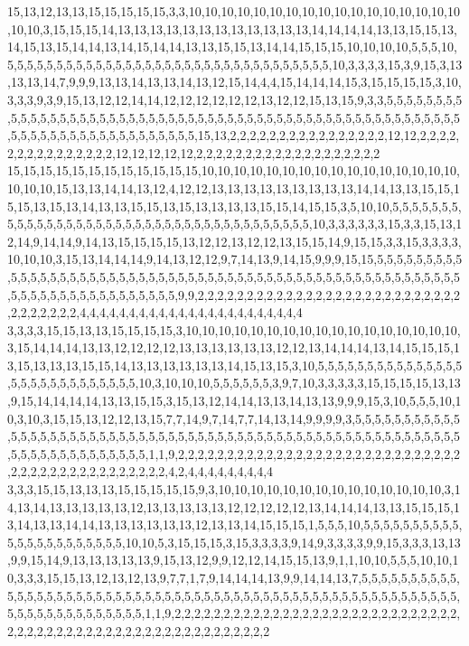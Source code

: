 15,13,12,13,13,15,15,15,15,15,3,3,10,10,10,10,10,10,10,10,10,10,10,10,10,10,10,10,10,10,10,3,15,15,15,14,13,13,13,13,13,13,13,13,13,13,13,13,14,14,14,14,13,13,15,15,13,14,15,13,15,14,14,13,14,15,14,14,13,13,15,15,13,14,14,15,15,15,10,10,10,10,5,5,5,10,5,5,5,5,5,5,5,5,5,5,5,5,5,5,5,5,5,5,5,5,5,5,5,5,5,5,5,5,5,5,5,5,5,10,3,3,3,3,15,3,9,15,3,13,13,13,14,7,9,9,9,13,13,14,13,13,14,13,12,15,14,4,4,15,14,14,14,15,3,15,15,15,15,3,10,3,3,3,9,3,9,15,13,12,12,14,14,12,12,12,12,12,12,13,12,12,15,13,15,9,3,3,5,5,5,5,5,5,5,5,5,5,5,5,5,5,5,5,5,5,5,5,5,5,5,5,5,5,5,5,5,5,5,5,5,5,5,5,5,5,5,5,5,5,5,5,5,5,5,5,5,5,5,5,5,5,5,5,5,5,5,5,5,5,5,5,5,5,5,5,5,5,5,5,5,15,13,2,2,2,2,2,2,2,2,2,2,2,2,2,2,2,2,12,12,2,2,2,2,2,2,2,2,2,2,2,2,2,2,2,12,12,12,12,12,2,2,2,2,2,2,2,2,2,2,2,2,2,2,2,2,2,2,2
15,15,15,15,15,15,15,15,15,15,15,15,10,10,10,10,10,10,10,10,10,10,10,10,10,10,10,10,10,10,10,15,13,13,14,14,13,12,4,12,12,13,13,13,13,13,13,13,13,13,14,14,13,13,15,15,15,15,13,15,13,14,13,13,15,15,13,15,13,13,13,13,15,15,14,15,15,3,5,10,10,5,5,5,5,5,5,5,5,5,5,5,5,5,5,5,5,5,5,5,5,5,5,5,5,5,5,5,5,5,5,5,5,5,5,5,5,5,5,10,3,3,3,3,3,3,15,3,3,15,13,12,14,9,14,14,9,14,13,15,15,15,15,13,12,12,13,12,12,13,15,15,14,9,15,15,3,3,15,3,3,3,3,10,10,10,3,15,13,14,14,14,9,14,13,12,12,9,7,14,13,9,14,15,9,9,9,15,15,5,5,5,5,5,5,5,5,5,5,5,5,5,5,5,5,5,5,5,5,5,5,5,5,5,5,5,5,5,5,5,5,5,5,5,5,5,5,5,5,5,5,5,5,5,5,5,5,5,5,5,5,5,5,5,5,5,5,5,5,5,5,5,5,5,5,5,5,5,5,5,5,9,9,2,2,2,2,2,2,2,2,2,2,2,2,2,2,2,2,2,2,2,2,2,2,2,2,2,2,2,2,2,2,2,2,2,2,4,4,4,4,4,4,4,4,4,4,4,4,4,4,4,4,4,4,4,4,4,4,4
3,3,3,3,15,15,13,13,15,15,15,15,3,10,10,10,10,10,10,10,10,10,10,10,10,10,10,10,10,10,3,15,14,14,14,13,13,12,12,12,12,13,13,13,13,13,13,12,12,13,14,14,14,13,14,15,15,15,13,15,13,13,13,15,15,14,13,13,13,13,13,13,14,15,13,15,3,10,5,5,5,5,5,5,5,5,5,5,5,5,5,5,5,5,5,5,5,5,5,5,5,5,5,5,5,5,10,3,10,10,10,5,5,5,5,5,5,3,9,7,10,3,3,3,3,3,15,15,15,15,13,13,9,15,14,14,14,14,13,13,15,15,3,15,13,12,14,14,13,13,14,13,13,9,9,9,15,3,10,5,5,5,10,10,3,10,3,15,15,13,12,12,13,15,7,7,14,9,7,14,7,7,14,13,14,9,9,9,9,3,5,5,5,5,5,5,5,5,5,5,5,5,5,5,5,5,5,5,5,5,5,5,5,5,5,5,5,5,5,5,5,5,5,5,5,5,5,5,5,5,5,5,5,5,5,5,5,5,5,5,5,5,5,5,5,5,5,5,5,5,5,5,5,5,5,5,5,5,5,5,5,1,1,9,2,2,2,2,2,2,2,2,2,2,2,2,2,2,2,2,2,2,2,2,2,2,2,2,2,2,2,2,2,2,2,2,2,2,2,2,2,2,2,2,2,2,2,2,2,4,2,4,4,4,4,4,4,4,4,4
3,3,3,15,15,13,13,13,15,15,15,15,15,9,3,10,10,10,10,10,10,10,10,10,10,10,10,10,10,3,14,13,14,13,13,13,13,13,12,13,13,13,13,13,12,12,12,12,12,13,14,14,14,13,13,15,15,15,13,14,13,13,14,14,13,13,13,13,13,13,12,13,13,14,15,15,15,1,5,5,5,10,5,5,5,5,5,5,5,5,5,5,5,5,5,5,5,5,5,5,5,5,5,5,10,10,5,3,15,15,15,3,15,3,3,3,3,9,14,9,3,3,3,3,9,9,15,3,3,3,13,13,9,9,15,14,9,13,13,13,13,13,9,15,13,12,9,9,12,12,14,15,15,13,9,1,1,10,10,5,5,5,10,10,10,3,3,3,15,15,13,12,13,12,13,9,7,7,1,7,9,14,14,14,13,9,9,14,14,13,7,5,5,5,5,5,5,5,5,5,5,5,5,5,5,5,5,5,5,5,5,5,5,5,5,5,5,5,5,5,5,5,5,5,5,5,5,5,5,5,5,5,5,5,5,5,5,5,5,5,5,5,5,5,5,5,5,5,5,5,5,5,5,5,5,5,5,5,5,5,5,1,1,9,2,2,2,2,2,2,2,2,2,2,2,2,2,2,2,2,2,2,2,2,2,2,2,2,2,2,2,2,2,2,2,2,2,2,2,2,2,2,2,2,2,2,2,2,2,2,2,2,2,2,2,2,2,2,2,2
